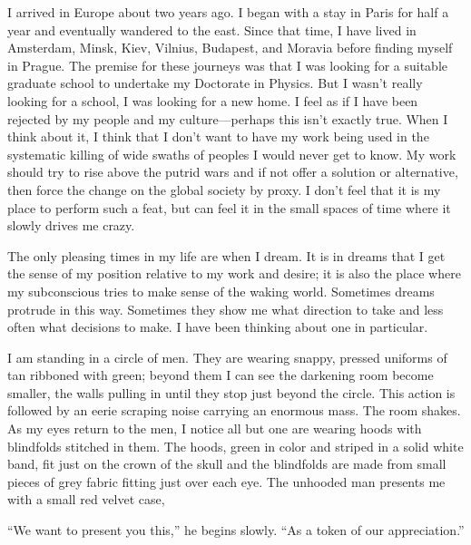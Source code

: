 \documentclass[
]{article}
\begin{document}
I arrived in Europe about two years ago. I began with a stay in Paris
for half a year and eventually wandered to the east. Since that time, I
have lived in Amsterdam, Minsk, Kiev, Vilnius, Budapest, and Moravia
before finding myself in Prague. The premise for these journeys was that
I was looking for a suitable graduate school to undertake my Doctorate
in Physics. But I wasn't really looking for a school, I was looking for
a new home. I feel as if I have been rejected by my people and my
culture---perhaps this isn't exactly true. When I think about it, I
think that I don't want to have my work being used in the systematic
killing of wide swaths of peoples I would never get to know. My work
should try to rise above the putrid wars and if not offer a solution or
alternative, then force the change on the global society by proxy. I
don't feel that it is my place to perform such a feat, but can feel it
in the small spaces of time where it slowly drives me crazy.

The only pleasing times in my life are when I dream. It is in dreams
that I get the sense of my position relative to my work and desire; it
is also the place where my subconscious tries to make sense of the
waking world. Sometimes dreams protrude in this way. Sometimes they show
me what direction to take and less often what decisions to make. I have
been thinking about one in particular.

I am standing in a circle of men. They are wearing snappy, pressed
uniforms of tan ribboned with green; beyond them I can see the darkening
room become smaller, the walls pulling in until they stop just beyond
the circle. This action is followed by an eerie scraping noise carrying
an enormous mass. The room shakes. As my eyes return to the men, I
notice all but one are wearing hoods with blindfolds stitched in them.
The hoods, green in color and striped in a solid white band, fit just on
the crown of the skull and the blindfolds are made from small pieces of
grey fabric fitting just over each eye. The unhooded man presents me
with a small red velvet case,

``We want to present you this,'' he begins slowly. ``As a token of our
appreciation.''
\end{document}
